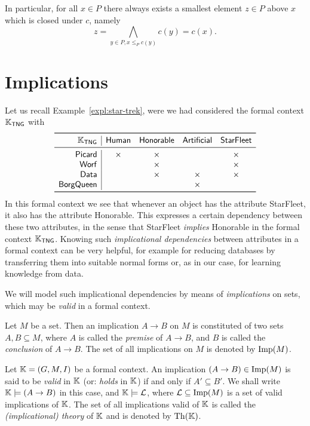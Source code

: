 In particular, for all $x \in P$ there always exists a smallest element $z \in P$ above
$x$ which is closed under $c$, namely
\begin{equation*}
  z = \bigwedge_{y \in P, x \leq_P c(y)} c(y) = c(x).
\end{equation*}

\section{Implications}
\label{sec:implications-sets}

Let us recall Example~\ref{expl:star-trek}, were we had considered the formal context
${\mathbb{K}}_{\mathsf{TNG}}$ with
\begin{equation*}
  \def\x{\times}
  \begin{array}{r|*{4}{c}}
    \toprule
    \con K_{\mathsf{TNG}} & \mathsf{Human} & \mathsf{Honorable} & \mathsf{Artificial} & \mathsf{StarFleet} \\
    \midrule
    \mathsf{Picard} & \x & \x & & \x \\
    \mathsf{Worf} & & \x & & \x \\
    \mathsf{Data} & & \x & \x & \x \\
    \mathsf{BorgQueen} & & & \x & \\
    \bottomrule
  \end{array}
\end{equation*}
In this formal context we see that whenever an object has the attribute
\textsf{StarFleet}, it also has the attribute \textsf{Honorable}.  This expresses a
certain dependency between these two attributes, in the sense that \textsf{StarFleet}
\emph{implies} \textsf{Honorable} in the formal context ${\mathbb{K}}_{\mathsf{TNG}}$.  Knowing
such \emph{implicational dependencies} between attributes in a formal context can be very
helpful, for example for reducing databases by transferring them into suitable normal
forms or, as in our case, for learning knowledge from data.

We will model such implicational dependencies by means of \emph{implications} on sets,
which may be \emph{valid} in a formal context.

\begin{Definition}
  Let $M$ be a set.  Then an implication $A \to B$ on $M$ is constituted of two sets $A, B
  \subseteq M$, where $A$ is called the \emph{premise} of $A \to B$, and $B$ is called the
  \emph{conclusion} of $A \to B$.  The set of all implications on $M$ is denoted by
  $\operatorname{Imp}(M)$.

  Let ${\mathbb{K}} = (G, M, I)$ be a formal context.  An implication $(A \to B) \in \operatorname{Imp}(M)$ is
  said to be \emph{valid} in ${\mathbb{K}}$ (or: \emph{holds} in ${\mathbb{K}}$) if and only if $A'
  \subseteq B'$.  We shall write ${\mathbb{K}} \models (A \to B)$ in this case, and ${\mathbb{K}}
  \models \mathcal{L}$, where $\mathcal{L} \subseteq \operatorname{Imp}(M)$ is a set of valid
  implications of ${\mathbb{K}}$.  The set of all implications valid of ${\mathbb{K}}$ is called the
  \emph{(implicational) theory} of ${\mathbb{K}}$ and is denoted by $\operatorname{Th}({\mathbb{K}})$.
\end{Definition}

